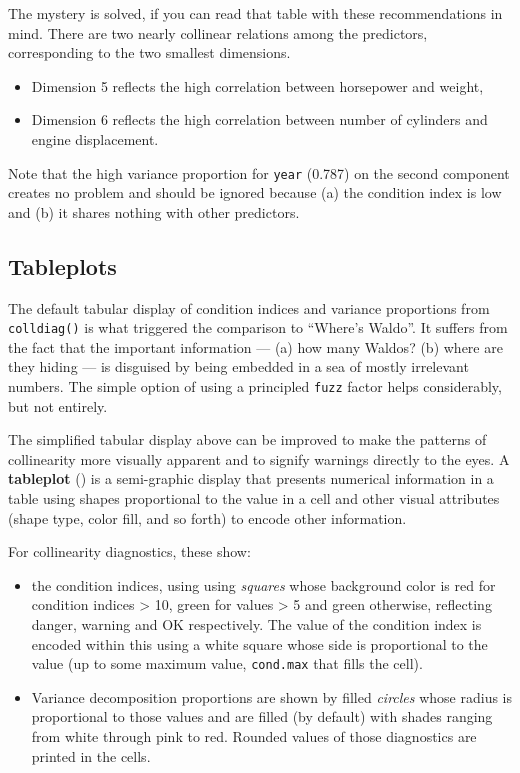 \documentclass[
  letterpaper,
  10pt,
  krantz2]{krantz}
\providecommand{\tightlist}{%
  \setlength{\itemsep}{0pt}\setlength{\parskip}{0pt}}\usepackage{longtable,booktabs,array}
\begin{document}
{The mystery is solved, if you can read that table with these
recommendations in mind. There are two nearly collinear relations among
the predictors, corresponding to the two smallest dimensions.

\begin{itemize}
\tightlist
\item
  Dimension 5 reflects the high correlation between horsepower and
  weight,
\item
  Dimension 6 reflects the high correlation between number of cylinders
  and engine displacement.
\end{itemize}

Note that the high variance proportion for \texttt{year} (0.787) on the
second component creates no problem and should be ignored because (a)
the condition index is low and (b) it shares nothing with other
predictors.

\subsection{Tableplots}\label{tableplots}

The default tabular display of condition indices and variance
proportions from \texttt{colldiag()} is what triggered the comparison to
``Where's Waldo''. It suffers from the fact that the important
information --- (a) how many Waldos? (b) where are they hiding --- is
disguised by being embedded in a sea of mostly irrelevant numbers. The
simple option of using a principled \texttt{fuzz} factor helps
considerably, but not entirely.

The simplified tabular display above can be improved to make the
patterns of collinearity more visually apparent and to signify warnings
directly to the eyes. A \textbf{tableplot}
() is a semi-graphic
display that presents numerical information in a table using shapes
proportional to the value in a cell and other visual attributes (shape
type, color fill, and so forth) to encode other information.

For collinearity diagnostics, these show:

\begin{itemize}
\item
  the condition indices, using using \emph{squares} whose background
  color is red for condition indices \textgreater{} 10, green for values
  \textgreater{} 5 and green otherwise, reflecting danger, warning and
  OK respectively. The value of the condition index is encoded within
  this using a white square whose side is proportional to the value (up
  to some maximum value, \texttt{cond.max} that fills the cell).
\item
  Variance decomposition proportions are shown by filled \emph{circles}
  whose radius is proportional to those values and are filled (by
  default) with shades ranging from white through pink to red. Rounded
  values of those diagnostics are printed in the cells.
\end{itemize}

}
\end{document}
